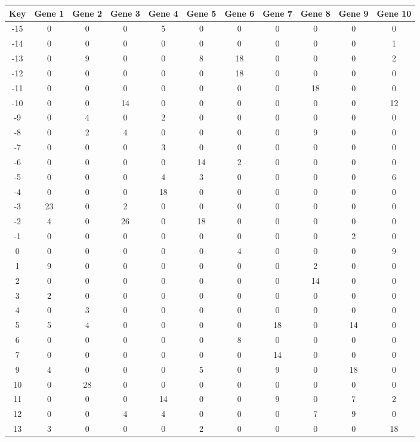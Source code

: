 \begin{tabular}{|c|c|c|c|c|c|c|c|c|c|c|}
\hline
Key & Gene 1 & Gene 2 & Gene 3 & Gene 4 & Gene 5 & Gene 6 & Gene 7 & Gene 8 & Gene 9 & Gene 10 \\
\hline
-15 & 0 & 0 & 0 & 5 & 0 & 0 & 0 & 0 & 0 & 0 \\
-14 & 0 & 0 & 0 & 0 & 0 & 0 & 0 & 0 & 0 & 1 \\
-13 & 0 & 9 & 0 & 0 & 8 & 18 & 0 & 0 & 0 & 2 \\
-12 & 0 & 0 & 0 & 0 & 0 & 18 & 0 & 0 & 0 & 0 \\
-11 & 0 & 0 & 0 & 0 & 0 & 0 & 0 & 18 & 0 & 0 \\
-10 & 0 & 0 & 14 & 0 & 0 & 0 & 0 & 0 & 0 & 12 \\
-9 & 0 & 4 & 0 & 2 & 0 & 0 & 0 & 0 & 0 & 0 \\
-8 & 0 & 2 & 4 & 0 & 0 & 0 & 0 & 9 & 0 & 0 \\
-7 & 0 & 0 & 0 & 3 & 0 & 0 & 0 & 0 & 0 & 0 \\
-6 & 0 & 0 & 0 & 0 & 14 & 2 & 0 & 0 & 0 & 0 \\
-5 & 0 & 0 & 0 & 4 & 3 & 0 & 0 & 0 & 0 & 6 \\
-4 & 0 & 0 & 0 & 18 & 0 & 0 & 0 & 0 & 0 & 0 \\
-3 & 23 & 0 & 2 & 0 & 0 & 0 & 0 & 0 & 0 & 0 \\
-2 & 4 & 0 & 26 & 0 & 18 & 0 & 0 & 0 & 0 & 0 \\
-1 & 0 & 0 & 0 & 0 & 0 & 0 & 0 & 0 & 2 & 0 \\
0 & 0 & 0 & 0 & 0 & 0 & 4 & 0 & 0 & 0 & 9 \\
1 & 9 & 0 & 0 & 0 & 0 & 0 & 0 & 2 & 0 & 0 \\
2 & 0 & 0 & 0 & 0 & 0 & 0 & 0 & 14 & 0 & 0 \\
3 & 2 & 0 & 0 & 0 & 0 & 0 & 0 & 0 & 0 & 0 \\
4 & 0 & 3 & 0 & 0 & 0 & 0 & 0 & 0 & 0 & 0 \\
5 & 5 & 4 & 0 & 0 & 0 & 0 & 18 & 0 & 14 & 0 \\
6 & 0 & 0 & 0 & 0 & 0 & 8 & 0 & 0 & 0 & 0 \\
7 & 0 & 0 & 0 & 0 & 0 & 0 & 14 & 0 & 0 & 0 \\
9 & 4 & 0 & 0 & 0 & 5 & 0 & 9 & 0 & 18 & 0 \\
10 & 0 & 28 & 0 & 0 & 0 & 0 & 0 & 0 & 0 & 0 \\
11 & 0 & 0 & 0 & 14 & 0 & 0 & 9 & 0 & 7 & 2 \\
12 & 0 & 0 & 4 & 4 & 0 & 0 & 0 & 7 & 9 & 0 \\
13 & 3 & 0 & 0 & 0 & 2 & 0 & 0 & 0 & 0 & 18 \\
\hline
\end{tabular}